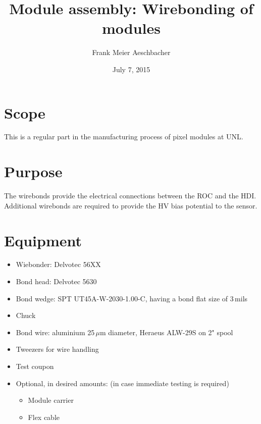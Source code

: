 \documentclass[12pt]{unlsilabsop}
\title{Module assembly: Wirebonding of modules}
\date{July 7, 2015}
\author{Frank Meier Aeschbacher}
\begin{document}
\maketitle

\section{Scope}
This is a regular part in the manufacturing process of pixel modules at UNL.

\section{Purpose}
The wirebonds provide the electrical connections between the ROC and the HDI. Additional wirebonds are required to provide the HV bias potential to the sensor.



\section{Equipment}

\begin{itemize}
    \item Wiebonder: Delvotec 56XX
    \item Bond head: Delvotec 5630
    \item Bond wedge: SPT UT45A-W-2030-1.00-C, having a bond flat size of 3\,mils
    \item Chuck
    \item Bond wire: aluminium 25\,$\mu$m diameter, Heraeus ALW-29S on 2" spool
    \item Tweezers for wire handling
    \item Test coupon
    \item Optional, in desired amounts: (in case immediate testing is required)
    \begin{itemize}
	\item Module carrier
	\item Flex cable
    \end{itemize}
\end{itemize}
\end{document}
